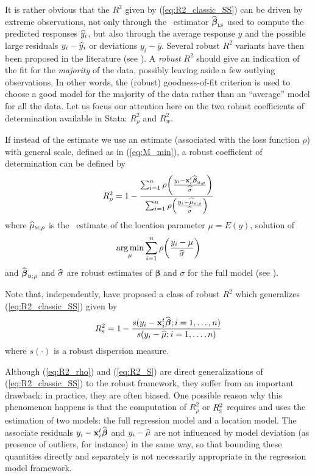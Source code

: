 It is rather obvious that the $R^2$ given by (\ref{eq:R2_classic_SS}) can be
driven by extreme observations, not only through the ~estimator
$\sthat{\boldsymbol\beta}_\stsc{LS}$ used to compute the predicted responses
$\widehat{y}_i$, but also through the average response $\overline{y}$ and the
possible large residuals $y_i - \widehat{y}_i$ or deviations $y_i -
\overline{y}$. Several robust $R^2$ variants have then been proposed in the
literature (see \citealp{Renaud:VictoriaFeser:2010}). A \emph{robust} $R^2$ should give an
indication of the fit for the \emph{majority} of the data, possibly leaving
aside a few outlying observations. In other words, the (robust) goodness-of-fit
criterion is used to choose a good model for the majority of the data rather
than an “average” model for all the data. Let us focus our attention here on
the two robust coefficients of determination available in Stata: $R_\rho^2$ and
$R_w^2$.

If instead of the  estimate we use an  estimate (associated with the loss
function $\rho$) with general scale, defined as in (\ref{eq:M_min}), a robust
coefficient of determination can be defined by
%
\begin{equation}\label{eq:R2_rho}
    R_\rho^2 = 1 - \frac{\sum_{i=1}^{n} 
    \rho\left(\frac{y_i-\stvec{x}_i^t\sthat{\boldsymbol\beta}_{\stsc{M};\rho}}{\sthat{\sigma}}\right)}
    {\sum_{i=1}^{n} \rho\left(\frac{y_i-\sthat{\mu}_{\stsc{M};\rho}}{\sthat{\sigma}}\right)}
\end{equation}
where $\sthat{\mu}_{\stsc{M};\rho}$ is the ~estimate of the location
parameter $\mu = E(y)$, solution of
\[
    \argmin_\mu \sum_{i=1}^{n} \rho\left(\frac{y_i-\mu}{\sthat{\sigma}}\right)
\]
and $\sthat{\boldsymbol\beta}_{\stsc{M};\rho}$ and $\widehat{\sigma}$ are robust
estimates of $\boldsymbol\beta$ and $\sigma$ for the full model (see
\citealp{maronna:etal:2006}).

Note that, independently, \citet{croux:dehon:2003} have proposed a class of
robust $R^2$ which generalizes (\ref{eq:R2_classic_SS}) given by
%
\begin{equation}\label{eq:R2_S}
    R_{\stsc{S}}^2 = 1 - \frac{s(y_i-\stvec{x}_i^t\widehat{\boldsymbol\beta}; i = 1, \dots, n)}
    {s(y_i-\sthat{\mu}; i = 1, \dots, n)} 
\end{equation}
%
where $s(\cdot)$ is a robust dispersion measure.

Although (\ref{eq:R2_rho}) and (\ref{eq:R2_S}) are direct generalizations of
(\ref{eq:R2_classic_SS}) to the robust framework, they suffer from an important
drawback: in practice, they are often biased. One possible reason why this
phenomenon happens is that the computation of $R_\rho^2$ or $R_\stsc{S}^2$
requires and uses the estimation of two models: the full regression model and a
location model. The associate residuals $y_i -
\mathbf x_i^t\widehat{\boldsymbol\beta}$ and $y_i - \widehat{\mu}$ are not
influenced by model deviation (as presence of outliers, for instance) in the
same way, so that bounding these quantities directly and separately is not
necessarily appropriate in the regression model framework.


